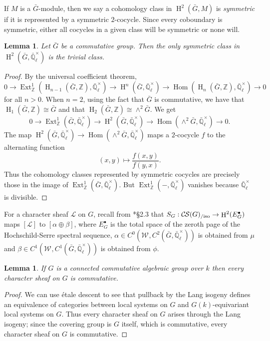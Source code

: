 \documentclass[10pt]{amsart}
\theoremstyle{plain}
\newtheorem{lemma}[theorem]{Lemma}
\theoremstyle{definition}
\newcommand{\ZZ}{{\mathbb{Z}}}
\newcommand{\EE}{\mathbb{\bar Q}_\ell}
\newcommand{\Fq}{k}
\newcommand{\EEx}{\EE^\times}
\newcommand{\Weil}[1]{\mathcal{W}_{#1}}
\DeclareMathOperator{\Hom}{Hom}
\DeclareMathOperator{\Ext}{Ext}
\DeclareMathOperator{\Hh}{H}
\newcommand{\cs}[1]{{\mathcal{#1}}}
\newcommand{\CS}{{\mathcal{C\hskip-0.8pt S}}}
\newcommand{\CSiso}[1]{\CS(#1)_{/\text{iso}}}
\newcommand{\bG}{\bar{G}}
\begin{document}
If $M$ is a $\bG$-module, then we say a cohomology class in $\Hh^2(\bG, M)$ is \emph{symmetric} if it is represented
by a symmetric $2$-cocycle.  Since every coboundary is symmetric, either all cocycles in a given class will be symmetric
or none will.

\begin{lemma} \label{lem:symtriv}
Let $\bG$ be a commutative group.  Then the only symmetric class in $\Hh^2(\bG, \EEx)$ is the trivial class.
\end{lemma}

\begin{proof}
By the universal coefficient theorem,
\[
0 \to \Ext^1_\ZZ(\Hh_{n-1}(\bG, \ZZ), \EEx) \to \Hh^n(\bG, \EEx) \to \Hom(\Hh_n(\bG, \ZZ), \EEx) \to 0
\]
for all $n > 0$.  When $n = 2$, using the fact that $\bG$ is commutative, we have that $\Hh_1(\bG, \ZZ) \cong \bG$
and that $\Hh_2(\bG, \ZZ) \cong \wedge^2 \bG$. We get
\[
0 \to \Ext^1_\ZZ(\bG, \EEx) \to \Hh^2(\bG, \EEx) \to \Hom(\wedge^2 \bG, \EEx) \to 0.
\]
The map $\Hh^2(\bG, \EEx) \to \Hom(\wedge^2 \bG, \EEx)$ maps a $2$-cocycle $f$ to the alternating function
\[
(x,y) \mapsto \frac{f(x,y)}{f(y,x)}.
\]
Thus the cohomology classes represented by symmetric cocycles are precisely those in the image of $\Ext^1_\ZZ(\bG, \EEx)$.
But $\Ext^1_\ZZ(-, \EEx)$ vanishes because $\EEx$ is divisible.
\end{proof}

For a character sheaf $\cs{L}$ on $G$, recall from \cite{cunningham-roe:13a}*{\S 2.3} that $S_G : \CSiso{G} \to \Hh^2(E_G^\bullet)$ maps
$[\cs{L}]$ to $[\alpha \oplus \beta]$, where $E_G^\bullet$ is the total space of the zeroth page
of the Hochschild-Serre spectral sequence, $\alpha \in C^0(\Weil{}, C^2(\bG, \EEx))$ is obtained from $\mu$ and
$\beta \in C^1(\Weil{}, C^1(\bG, \EEx))$ is obtained from $\phi$.

\begin{lemma} \label{lem:conncomm}
If $G$ is a connected commutative algebraic group over $\Fq$ then every character sheaf on $G$ is commutative.
\end{lemma}

\begin{proof}
We can use \'etale descent to see that pullback by the Lang isogeny defines an equivalence
of categories between local systems on $G$ and $G(\Fq)$-equivariant local systems on $G$.  Thus every character
sheaf on $G$ arises through the Lang isogeny; since the covering group is $G$ itself, which is commutative,
every character sheaf on $G$ is commutative.
\end{proof}
\end{document}
